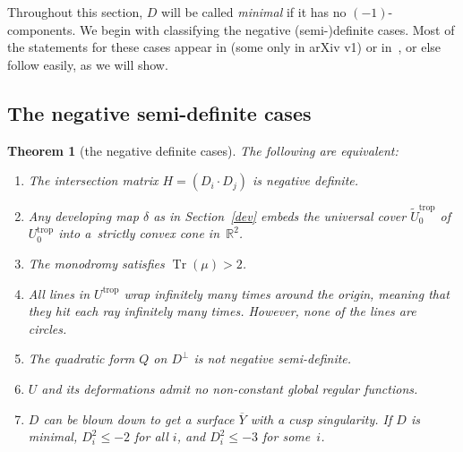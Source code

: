 \documentclass[10pt,a4paper]{amsart}
\numberwithin{equation}{section}
\numberwithin{figure}{section}
\numberwithin{table}{section}
\DeclareMathOperator{\Tr}{Tr}
\DeclareMathOperator{\trop}{trop}
\let\?=\overline
\let\bb=\mathbb
\let\wt=\widetilde
\newtheorem{thm}{Theorem}[section]
\theoremstyle{definition}
\begin{document}
Throughout this section, $D$ will be called {\it minimal} if it has no $(-1)$-components. We begin with classifying the negative (semi-)definite cases. Most of the statements for these cases appear in \cite{GHK1} (some only in arXiv v1) or in~\cite{GHK2}, or else follow easily, as we will show.

\subsection{The negative semi-definite cases}

\begin{thm}[the negative definite cases]\label{NegD}
The following are equivalent:
\begin{enumerate}\itemsep=0pt
\item[$1.$] The {intersection matrix} $H=(D_i \cdot D_j)$ is negative definite.
\item[$2.$] Any {developing map} $\delta$ as in Section~{\rm \ref{dev}} embeds the universal cover $\wt{U}_0^{\trop}$ of $U^{\trop}_0$ into a~strictly convex cone in~$\bb{R}^2$.
\item[$3.$] The {monodromy} satisfies $\Tr(\mu) > 2$.
\item[$4.$] All {lines} in $U^{\trop}$ wrap infinitely many times around the origin, meaning that they hit each ray infinitely many times. However, none of the lines are circles.
\item[$5.$] The {quadratic form} $Q$ on $D^{\perp}$ is not negative semi-definite.
\item[$6.$] $U$ and its deformations admit no non-constant global regular {functions}.
\item[$7.$] $D$ can be blown down to get a surface $\?{Y}$ with a cusp singularity. If $D$ is minimal, $D_i^2 \leq -2$ for all $i$, and $D_i^2 \leq -3$ for some~$i$.
\end{enumerate}
\end{thm}
\end{document}
